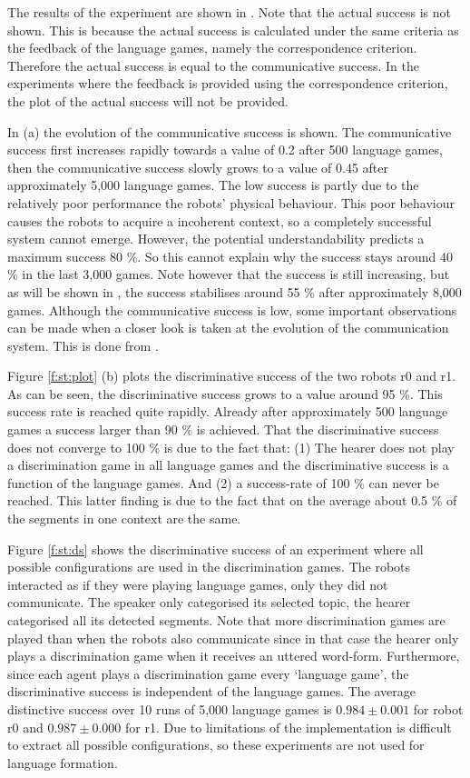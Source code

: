 The results of the experiment are shown in . Note that the actual success is not shown. This is because the actual success is calculated under the same criteria as the feedback of the language games, namely the correspondence criterion. Therefore the actual success is equal to the communicative success. In the experiments where the feedback is provided using the correspondence criterion, the plot of the actual success will not be provided.

In  (a) the evolution of the communicative success is shown. The communicative success first increases rapidly towards a value of 0.2 after 500 language games, then the communicative success slowly grows to a value of 0.45 after approximately 5,000 language games. The low success is partly due to the relatively poor performance the robots' physical behaviour. This poor behaviour causes the robots to acquire a incoherent context, so a completely successful system cannot emerge. However, the potential understandability predicts a maximum success 80 \%. So this cannot explain why the success stays around 40 \% in the last 3,000 games. Note however that the success is still increasing, but as will be shown in , the success stabilises around 55 \% after approximately 8,000 games. Although the communicative success is low, some important observations can be made when a closer look is taken at the evolution of the communication system. This is done from .

Figure \ref{f:st:plot} (b) plots the discriminative success of the two robots r0 and r1. As can be seen, the discriminative success grows to a value around 95 \%. This success rate is reached quite rapidly. Already after approximately 500 language games a success larger than 90 \% is achieved. That the discriminative success does not converge to 100 \% is due to the fact that: (1) The hearer does not play a discrimination game in all language games and the discriminative success is a function of the language games. And (2) a success-rate of 100 \% can never be reached. This latter finding is due to the fact that on the average about 0.5 \% of the segments in one context are the same. 

Figure \ref{f:st:ds} shows the discriminative success of an experiment where all possible configurations are used in the discrimination games. The robots interacted as if they were playing language games, only they did not communicate. The speaker only categorised its selected topic, the hearer categorised all its detected segments. Note that more discrimination games are played than when the robots also communicate since in that case the hearer only plays a discrimination game when it receives an uttered word-form. Furthermore, since each agent plays a discrimination game every `language game', the discriminative success is independent of the language games. The average distinctive success over 10 runs of 5,000 language games is $0.984 \pm 0.001$ for robot r0 and $0.987 \pm 0.000$ for r1. Due to limitations of the implementation is difficult to extract all possible configurations, so these experiments are not used for language formation.

